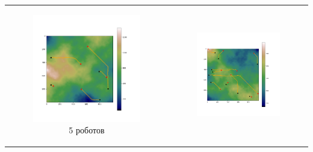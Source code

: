 \documentclass{article}
\numberwithin{equation}{section}
\begin{document}
	\begin{table}[H]
		\begin{tabular}{c c}
			\begin{subfigure}{0.5\linewidth}
				\includegraphics[width = 1.0\columnwidth]{data/mean_paths/1000x1000/5.png}
			\caption*{5 роботов}
			\end{subfigure}
			&
			\begin{subfigure}{0.5\linewidth}
				\includegraphics[width = 1.0\columnwidth]{data/mean_paths/1000x1000/10.png}

\end{subfigure}
\end{tabular}
\end{table}
\end{document}
